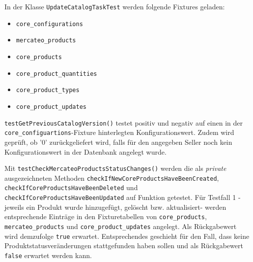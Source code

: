	In der Klasse \texttt{UpdateCatalogTaskTest} werden folgende Fixtures geladen:
	\begin{itemize}[nosep]
		\item \texttt{core\_configurations}
		\item \texttt{mercateo\_products}
		\item \texttt{core\_products}
		\item \texttt{core\_product\_quantities}
		\item \texttt{core\_product\_types}
		\item \texttt{core\_product\_updates}
	\end{itemize}
	\texttt{testGetPreviousCatalogVersion()} testet positiv und negativ auf einen in der \texttt{core\_configuartions}-Fixture hinterlegten Konfigurationswert. Zudem wird geprüft, ob '0' zurückgeliefert wird, falls für den angegeben Seller noch kein Konfigurationswert in der Datenbank angelegt wurde.
	
	Mit \texttt{testCheckMercateoProductsStatusChanges()} werden die als \textit{private} ausgezeichneten Methoden \texttt{checkIfNewCoreProductsHaveBeenCreated}, 
	\texttt{checkIfCoreProductsHaveBeenDeleted} und
	\texttt{checkIfCoreProductsHaveBeenUpdated} auf Funktion getestet. Für Testfall 1 - jeweils ein Produkt wurde hinzugefügt, gelöscht bzw. aktualisiert- werden entsprechende Einträge in den Fixturetabellen von \texttt{core\_products}, \texttt{mercateo\_products} und \texttt{core\_product\_updates} angelegt. Als Rückgabewert wird demzufolge \texttt{true} erwartet. Entsprechendes geschieht für den Fall, dass keine Produktstatusveränderungen stattgefunden haben sollen und als Rückgabewert \texttt{false} erwartet werden kann.

	

